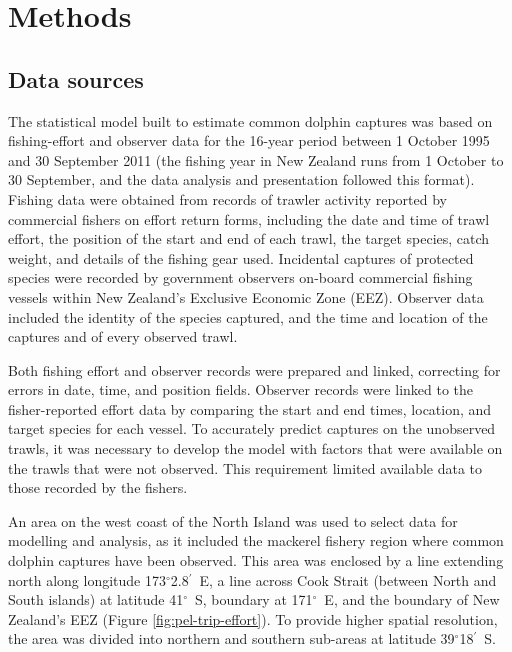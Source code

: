 \documentclass[10pt]{article}
\newcommand{\degrees}{\ensuremath{^\circ}}
\newcommand{\minutes}{\ensuremath{^\prime}}
\begin{document}
\section*{Methods}
\subsection*{Data sources}
The statistical model built to estimate common dolphin captures was based on fishing-effort and observer data for the 16-year period between 1 October 1995 and 30 September 2011 (the fishing year in New Zealand runs from 1 October to 30 September, and the data analysis and presentation followed this format).  Fishing data were obtained from records of trawler activity reported by commercial fishers on effort return forms, including the date and time of trawl effort, the position of the start and end of each trawl, the target species, catch weight, and details of the fishing gear used. Incidental captures of protected species were recorded by government observers on-board commercial fishing vessels within New Zealand's Exclusive Economic Zone (EEZ). Observer data included the identity of the species captured, and the time and location of the captures and of every observed trawl.  

Both fishing effort and observer records were prepared and linked, correcting for errors in date, time, and position fields. Observer records were linked to the fisher-reported effort data by comparing the start and end times, location, and target species for each vessel. To accurately predict captures on the unobserved trawls, it was necessary to develop the model with factors that were available on the trawls that were not observed. This requirement limited available data to those recorded by the fishers. 

An area on the west coast of the North Island was used to select data for
modelling and analysis, as it included the mackerel fishery region where common dolphin captures have been observed. This area was enclosed by a line extending north along
longitude 173\degrees 2.8\minutes\ E, a line across Cook Strait (between North and South islands) at latitude 41\degrees\
S, boundary at 171\degrees\ E, and  the boundary of New Zealand's EEZ (Figure \ref{fig:pel-trip-effort}).
To provide higher spatial resolution, the area was divided into northern and southern sub-areas 
at latitude 39\degrees 18\minutes~S.  
 
\end{document}

